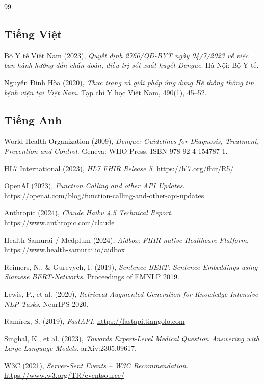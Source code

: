 \documentclass[oneside, a4paper]{book}
\theoremstyle{plain}
\theoremstyle{plain}
\theoremstyle{definition}
\theoremstyle{remark}
\begin{document}
\begin{thebibliography}{99}

\subsection*{Tiếng Việt}

 Bộ Y tế Việt Nam (2023), \textit{Quyết định 2760/QĐ-BYT ngày 04/7/2023 về việc ban hành hướng dẫn chẩn đoán, điều trị sốt xuất huyết Dengue}. Hà Nội: Bộ Y tế.

 Nguyễn Đình Hòa (2020), \textit{Thực trạng và giải pháp ứng dụng Hệ thống thông tin bệnh viện tại Việt Nam}. Tạp chí Y học Việt Nam, 490(1), 45--52.

\subsection*{Tiếng Anh}

 World Health Organization (2009), \textit{Dengue: Guidelines for Diagnosis, Treatment, Prevention and Control}. Geneva: WHO Press. ISBN 978-92-4-154787-1.

 HL7 International (2023), \textit{HL7 FHIR Release 5}. \url{https://hl7.org/fhir/R5/}

 OpenAI (2023), \textit{Function Calling and other API Updates}. \url{https://openai.com/blog/function-calling-and-other-api-updates}

 Anthropic (2024), \textit{Claude Haiku 4.5 Technical Report}. \url{https://www.anthropic.com/claude}

 Health Samurai / Medplum (2024), \textit{Aidbox: FHIR-native Healthcare Platform}. \url{https://www.health-samurai.io/aidbox}

 Reimers, N., \& Gurevych, I. (2019), \textit{Sentence-BERT: Sentence Embeddings using Siamese BERT-Networks}. Proceedings of EMNLP 2019.

 Lewis, P., et al. (2020), \textit{Retrieval-Augmented Generation for Knowledge-Intensive NLP Tasks}. NeurIPS 2020.

 Ramírez, S. (2019), \textit{FastAPI}. \url{https://fastapi.tiangolo.com}

 Singhal, K., et al. (2023), \textit{Towards Expert-Level Medical Question Answering with Large Language Models}. arXiv:2305.09617.

 W3C (2021), \textit{Server-Sent Events -- W3C Recommendation}. \url{https://www.w3.org/TR/eventsource/}

\end{thebibliography}
\end{document}
